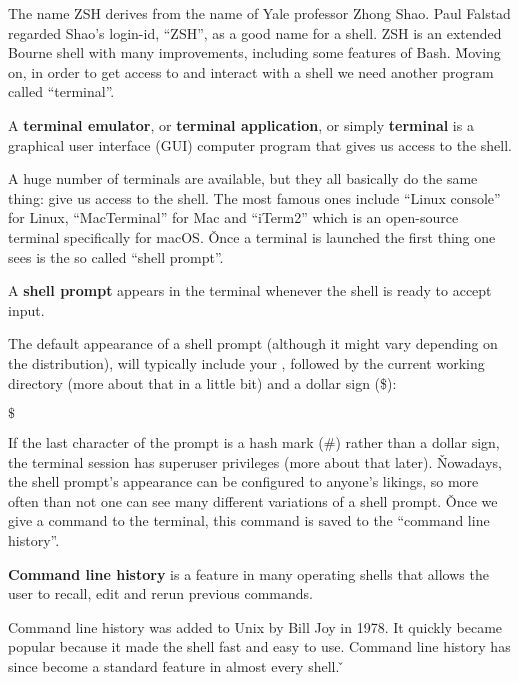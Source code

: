 The name ZSH derives from the name of Yale professor Zhong Shao. Paul Falstad regarded Shao's login-id, ``ZSH'', as a
good name for a shell. ZSH is an extended Bourne shell with many improvements, including some features of Bash. \v

Moving on, in order to get access to and interact with a shell we need another program called ``terminal''.

A \textbf{terminal emulator}, or \textbf{terminal application}, or simply \textbf{terminal} is a graphical user
interface (GUI) computer program that gives us access to the shell.
\ed

A huge number of terminals are available, but they all basically do the same thing: give us access to the shell. The
most famous ones include ``Linux console'' for Linux, ``MacTerminal'' for Mac and ``iTerm2'' which is an open-source
terminal specifically for macOS. \v

Once a terminal is launched the first thing one sees is the so called ``shell prompt''.

A \textbf{shell prompt} appears in the terminal whenever the shell is ready to accept input.
\ed

The default appearance of a shell prompt (although it might vary depending on the distribution), will typically include
your , followed by the current working directory (more about that in a little bit) and a
dollar sign (\$):
\begin{bash}
$\$$
\end{bash}

If the last character of the prompt is a hash mark (\#) rather than a dollar sign, the terminal session has superuser
privileges (more about that later). \v

Nowadays, the shell prompt's appearance can be configured to anyone's likings, so more often than not one can see many
different variations of a shell prompt. \v

Once we give a command to the terminal, this command is saved to the ``command line history''.

\textbf{Command line history} is a feature in many operating shells that allows the user to recall, edit and rerun
previous commands.
\ed

Command line history was added to Unix by Bill Joy in 1978. It quickly became popular because it made the shell fast
and easy to use. Command line history has since become a standard feature in almost every shell. \v

